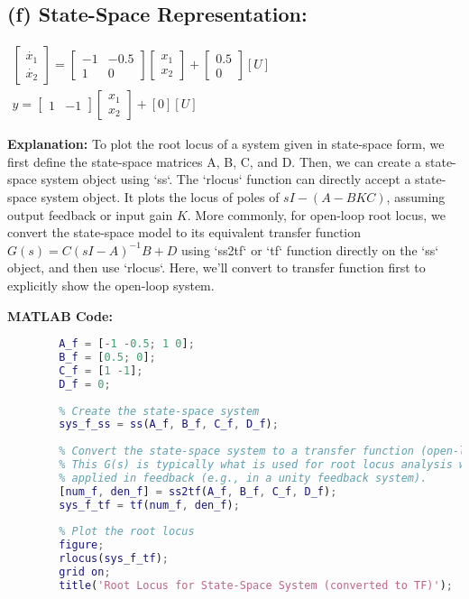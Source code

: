 \documentclass[a4paper,12pt]{article}
\begin{document}
	\subsection*{(f) State-Space Representation:}
	$\begin{array}{l} \begin{bmatrix} \dot{x_1} \\ \dot{x_2} \end{bmatrix} = \begin{bmatrix} -1 & -0.5 \\ 1 & 0 \end{bmatrix} \begin{bmatrix} x_1 \\ x_2 \end{bmatrix} + \begin{bmatrix} 0.5 \\ 0 \end{bmatrix} [U] \\ y = \begin{bmatrix} 1 & -1 \end{bmatrix} \begin{bmatrix} x_1 \\ x_2 \end{bmatrix} + [0] [U] \end{array}$
	
	\textbf{Explanation:}
	To plot the root locus of a system given in state-space form, we first define the state-space matrices A, B, C, and D. Then, we can create a state-space system object using `ss`. The `rlocus` function can directly accept a state-space system object. It plots the locus of poles of $sI - (A - BKC)$, assuming output feedback or input gain $K$. More commonly, for open-loop root locus, we convert the state-space model to its equivalent transfer function $G(s) = C(sI-A)^{-1}B+D$ using `ss2tf` or `tf` function directly on the `ss` object, and then use `rlocus`. Here, we'll convert to transfer function first to explicitly show the open-loop system.
	
	\textbf{MATLAB Code:}
	\begin{lstlisting}[language=Matlab, caption=MATLAB Code for System (f)]
		% Define state-space matrices
		A_f = [-1 -0.5; 1 0];
		B_f = [0.5; 0];
		C_f = [1 -1];
		D_f = 0;
		
		% Create the state-space system
		sys_f_ss = ss(A_f, B_f, C_f, D_f);
		
		% Convert the state-space system to a transfer function (open-loop G(s))
		% This G(s) is typically what is used for root locus analysis when a gain K is
		% applied in feedback (e.g., in a unity feedback system).
		[num_f, den_f] = ss2tf(A_f, B_f, C_f, D_f);
		sys_f_tf = tf(num_f, den_f);
		
		% Plot the root locus
		figure;
		rlocus(sys_f_tf);
		grid on;
		title('Root Locus for State-Space System (converted to TF)');
	\end{lstlisting}
	
\end{document}
